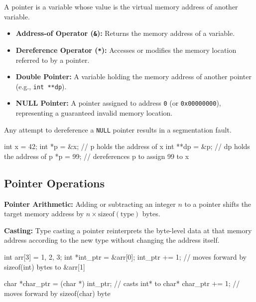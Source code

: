 \begin{definition}
    A pointer is a variable whose value is the virtual memory address of another variable.
    \begin{itemize}
        \item \textbf{Address-of Operator (\texttt{\&}):} Returns the memory address of a variable.
        \item \textbf{Dereference Operator (\texttt{*}):} Accesses or modifies the memory location referred to by a pointer.
        \item \textbf{Double Pointer:} A variable holding the memory address of another pointer (e.g., \texttt{int **dp}).
        \item \textbf{NULL Pointer:} A pointer assigned to address \texttt{0} (or \texttt{0x00000000}), representing a guaranteed invalid memory location.
    \end{itemize}
\end{definition}

\begin{important}
    Any attempt to dereference a \texttt{NULL} pointer results in a segmentation fault.
\end{important}

\begin{codeexample}
int x = 42;
int *p = &x;   // p holds the address of x
int **dp = &p; // dp holds the address of p
*p = 99;       // dereferences p to assign 99 to x
\end{codeexample}

\subsection{Pointer Operations}

\begin{definition}
    \textbf{Pointer Arithmetic:} Adding or subtracting an integer $n$ to a pointer shifts the target memory address by $n \times \text{sizeof}(\text{type})$ bytes.
\end{definition}

\begin{definition}
    \textbf{Casting:} Type casting a pointer reinterprets the byte-level data at that memory address according to the new type without changing the address itself.
\end{definition}

\begin{codeexample}
int arr[3] = {1, 2, 3};
int *int_ptr = &arr[0];
int_ptr += 1; // moves forward by sizeof(int) bytes to &arr[1]

char *char_ptr = (char *) int_ptr; // casts int* to char*
char_ptr += 1; // moves forward by sizeof(char) byte
\end{codeexample}

